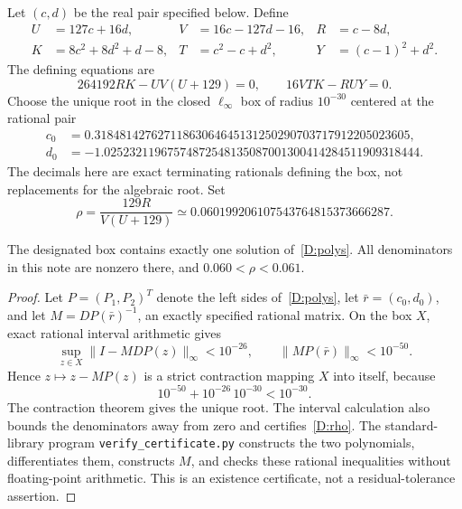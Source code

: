 Let $(c,d)$ be the real pair specified below. Define
\begin{align*}
 U&=127c+16d,& V&=16c-127d-16,& R&=c-8d,\\
 K&=8c^2+8d^2+d-8,& T&=c^2-c+d^2,& Y&=(c-1)^2+d^2.
\end{align*}
The defining equations are
\begin{equation}\label{D:polys}
 \boxed{264192RK-U V(U+129)=0,\qquad16VTK-RUY=0.}
\end{equation}
Choose the unique root in the closed $\ell_\infty$ box of radius $10^{-30}$ centered at the rational pair
\begin{align*}
 c_0&=0.31848142762711863064645131250290703717912205023605,\\
 d_0&=-1.02523211967574872548135087001300414284511909318444.
\end{align*}
The decimals here are exact terminating rationals defining the box, not replacements for the algebraic root. Set
\begin{equation}\label{D:rho}
 \rho=\frac{129R}{V(U+129)}
       \simeq0.060199206107543764815373666287.
\end{equation}

\begin{lemma}\label{D:root}
The designated box contains exactly one solution of~\eqref{D:polys}. All denominators in this note are nonzero there, and $0.060<\rho<0.061$.
\end{lemma}
\begin{proof}
Let $P=(P_1,P_2)^T$ denote the left sides of~\eqref{D:polys}, let $\bar r=(c_0,d_0)$, and let $M=DP(\bar r)^{-1}$, an exactly specified rational matrix. On the box $X$, exact rational interval arithmetic gives
\[
 \sup_{z\in X}\|I-MDP(z)\|_\infty<10^{-26},
 \qquad\|MP(\bar r)\|_\infty<10^{-50}.
\]
Hence $z\mapsto z-MP(z)$ is a strict contraction mapping $X$ into itself, because
\[
 10^{-50}+10^{-26}\,10^{-30}<10^{-30}.
\]
The contraction theorem gives the unique root. The interval calculation also bounds the denominators away from zero and certifies~\eqref{D:rho}. The standard-library program \texttt{verify\_certificate.py} constructs the two polynomials, differentiates them, constructs $M$, and checks these rational inequalities without floating-point arithmetic. This is an existence certificate, not a residual-tolerance assertion.
\end{proof}

